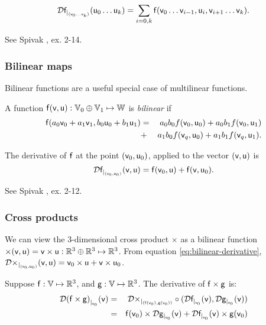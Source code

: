 \begin{equation}
\Dc{\f}{(\v_0 \ldots \v_k)}{\u_0 \ldots \u_k}
 =  \sum_{i=0,k} \f(\v_0 \ldots \v_{i-1},\u_i,\v_{i+1} \ldots \v_k).
\end{equation}

See Spivak \cite{spivak-1965}, ex. 2-14.



\subsubsection{Bilinear maps}
\label{sec:Bilinear-functions}

Bilinear functions are a useful special case of multilinear functions.

A function $\f(\v,\u):\Vspace_0 \oplus \Vspace_1 \mapsto \Wspace$
is {\it bilinear} if
\begin{eqnarray}
\f(a_0 \v_0 + a_1 \v_1, b_0 \u_0 + b_1 \u_1)
& =  & a_0 b_0 f(\v_0,\u_0)
+  a_0 b_1 f(\v_0,\u_1)
\\
& +  & a_1 b_0 f(\v_q,\u_0)
 +  a_1 b_1 f(\v_q,\u_1).
\nonumber
\end{eqnarray}

The derivative of $\f$
at the point $(\v_0,\u_0)$, applied to the vector $(\v,\u)$ is
\begin{equation}
\label{eq:bilinear-derivative}
\Dc{\f}{(\v_0,\u_0)}{\v,\u} = \f(\v_0,\u) + \f(\v,\u_0).
\end{equation}

See Spivak \cite{spivak-1965}, ex. 2-12.



\subsubsection{Cross products}
\label{sec:cross-products}

We can view the 3-dimensional cross product
$ \times $
as a bilinear function
$\times(\v,\u) = \v \times \u : \Reals^3 \oplus \Reals^3 \mapsto \Reals^3$.
From equation \ref{eq:bilinear-derivative},
$\Dc{\times}{(\v_0,\u_0)}{\v,\u} = \v_0 \times \u + \v \times \u_0$.

Suppose
$\f:\Vspace \mapsto \Reals^3$, and
$\g:\Vspace \mapsto \Reals^3$.
The derivative of $\f \times \g$ is:
\begin{eqnarray}
\Dc{(\f \times \g)}{\v_0}{\v}
& =
& \Db{\times}{(\f(\v_0),\g(\v_0))} \circ (\Dc{\f}{\v_0}{\v}, \Dc{\g}{\v_0}{\v})
\\
& =
& \f(\v_0) \times \Dc{\g}{\v_0}{\v} + \Dc{\f}{\v_0}{\v} \times \g(\v_0) \nonumber
\end{eqnarray}

